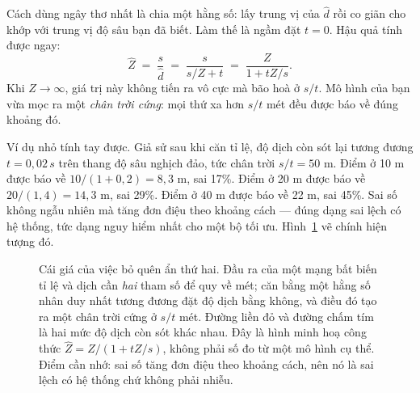 \documentclass[../../deep_learning.tex]{subfiles}
\begin{document}
Cách dùng ngây thơ nhất là chia một hằng số: lấy trung vị của \(\hat{d}\) rồi co giãn cho khớp với trung vị độ sâu bạn đã biết. Làm thế là ngầm đặt \(t = 0\). Hậu quả tính được ngay:
\[
\hat{Z} \;=\; \frac{s}{\hat{d}} \;=\; \frac{s}{s/Z + t} \;=\; \frac{Z}{1 + tZ/s} .
\]
Khi \(Z \rightarrow \infty\), giá trị này không tiến ra vô cực mà bão hoà ở \(s/t\). Mô hình của bạn vừa mọc ra một \emph{chân trời cứng}: mọi thứ xa hơn \(s/t\) mét đều được báo về đúng khoảng đó.

Ví dụ nhỏ tính tay được. Giả sử sau khi căn tỉ lệ, độ dịch còn sót lại tương đương \(t = 0{,}02\,s\) trên thang độ sâu nghịch đảo, tức chân trời \(s/t = 50\) m. Điểm ở 10 m được báo về \(10/(1+0{,}2) = 8{,}3\) m, sai 17\%. Điểm ở 20 m được báo về \(20/(1{,}4) = 14{,}3\) m, sai 29\%. Điểm ở 40 m được báo về 22 m, sai 45\%. Sai số không ngẫu nhiên mà tăng đơn điệu theo khoảng cách --- đúng dạng sai lệch có hệ thống, tức dạng nguy hiểm nhất cho một bộ tối ưu. Hình~\ref{fig:f30-scale-shift} vẽ chính hiện tượng đó.

\begin{figure}[H]\centering
{}
\caption{Cái giá của việc bỏ quên ẩn thứ hai. Đầu ra của một mạng bất biến tỉ lệ và dịch cần \emph{hai} tham số để quy về mét; căn bằng một hằng số nhân duy nhất tương đương đặt độ dịch bằng không, và điều đó tạo ra một chân trời cứng ở \(s/t\) mét. Đường liền đỏ và đường chấm tím là hai mức độ dịch còn sót khác nhau. Đây là hình minh hoạ công thức \(\hat{Z} = Z/(1+tZ/s)\), không phải số đo từ một mô hình cụ thể. Điểm cần nhớ: sai số tăng đơn điệu theo khoảng cách, nên nó là sai lệch có hệ thống chứ không phải nhiễu.}
\label{fig:f30-scale-shift}
\end{figure}
\end{document}
